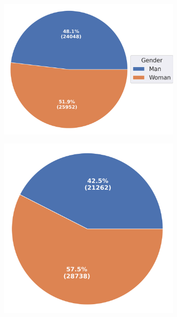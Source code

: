 \begin{figure}  [ht!]
\begin{subfigure}{0.25\textwidth}
    \includegraphics[width=\linewidth]{figs/plots/data-0-0_gender_Gender.png} 
  \end{subfigure}\hfill
  \begin{subfigure}{0.235\textwidth}
  \centering
    \includegraphics[width=0.8\linewidth]{figs/plots/standard_sampler-1000-1000_gender_Gender.png}
  \end{subfigure}\hfill
  \begin{subfigure}{0.235\textwidth}
  \centering

\end{subfigure}
\end{figure}
